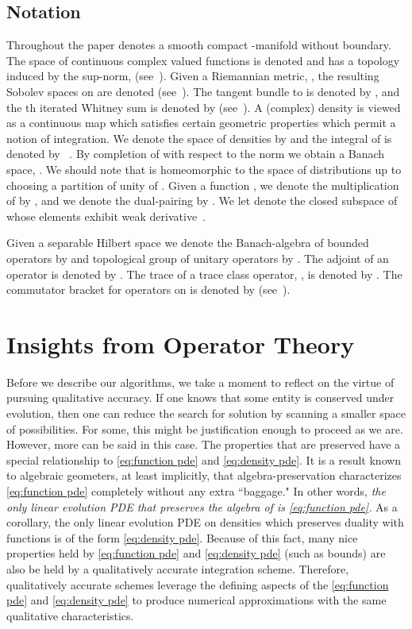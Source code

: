 \documentclass[final,leqno]{amsart}
\begin{document}
\subsection{Notation}
Throughout the paper  denotes a smooth compact -manifold without boundary. 
The space of continuous complex valued functions is denoted  and has a topology induced by the sup-norm,  (see~\cite{Taylor1974,Rudin1991,MTA,Conway1990}).
Given a Riemannian metric, , the resulting Sobolev spaces on  are denoted  (see~\cite{Hebey1999}).
The tangent bundle to  is denoted by , and the th iterated Whitney sum is denoted by  (see~\cite{Lee2006,MTA}).
A (complex) density is viewed as a continuous map  which satisfies certain geometric properties which permit a notion of integration.
We denote the space of densities by  and the integral of  is denoted by ~\cite[Chapter 16]{Lee2006}.
By completion of  with respect to the norm  we obtain a Banach space, .
We should note that  is homeomorphic to the space of distributions up to choosing a partition of unity of .
Given a function , we denote the multiplication of  by , and we denote the dual-pairing by .
We let  denote the closed subspace of  whose elements exhibit  weak derivative~\cite{Hormander2003}.

Given a separable Hilbert space  we denote the Banach-algebra of bounded operators by  and topological group of unitary operators by .
The adjoint of an operator  is denoted by .
The trace of a trace class operator, , is denoted by .
The commutator bracket for operators  on  is denoted by  (see~\cite{Conway1990}).






\section{Insights from Operator Theory}
\label{sec:operator theory}
Before we describe our algorithms, we take a moment to reflect on the virtue of pursuing qualitative accuracy.
If one knows that some entity is conserved under evolution, then one can reduce the search for solution by scanning a smaller space of possibilities.
For some, this might be justification enough to proceed as we are.
However, more can be said in this case.
The properties that are preserved have a special relationship to \eqref{eq:function pde} and \eqref{eq:density pde}.
It is a result known to algebraic geometers, at least implicitly, that algebra-preservation characterizes \eqref{eq:function pde} completely without any extra ``baggage."
In other words, \emph{the only linear evolution PDE that preserves the algebra of  is \eqref{eq:function pde}.}
As a corollary, the only linear evolution PDE on densities which preserves duality with functions is of the form \eqref{eq:density pde}.
Because of this fact, many nice properties held by \eqref{eq:function pde} and \eqref{eq:density pde} (such as bounds) are also be held by a qualitatively accurate integration scheme.
Therefore, qualitatively accurate schemes leverage the defining aspects of the \eqref{eq:function pde} and \eqref{eq:density pde} to produce numerical approximations with the same qualitative characteristics.
\end{document}
